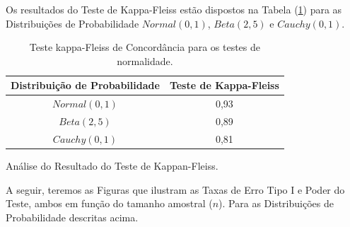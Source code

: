 \documentclass[a4paper,11pt]{article} %
\begin{document}
\vspace{0.5cm}

Os resultados do Teste de Kappa-Fleiss estão dispostos na Tabela (\ref{tab:resultKappaFleiss}) para as Distribuições de Probabilidade $Normal(0, 1)$, $Beta(2, 5)$ e $Cauchy(0, 1)$.

\begin{table}[H]
\centering
\caption{Teste kappa-Fleiss de Concordância para os testes de normalidade.}
    \begin{tabular}{c|c}
    \hline
    Distribuição de Probabilidade  &  Teste de Kappa-Fleiss\\
    \hline
          $Normal(0, 1)$           &  0,93  \\
          $Beta(2, 5)$             &  0,89  \\
          $Cauchy(0, 1)$           &  0,81  \\
    \hline\hline
    \end{tabular}
    
    \label{tab:resultKappaFleiss}
\end{table}

Análise do Resultado do Teste de Kappan-Fleiss.

\vspace{0.5cm}

A seguir, teremos as Figuras que ilustram as Taxas de Erro Tipo I e Poder do Teste, ambos em função do tamanho amostral ($n$). Para as Distribuições de Probabilidade descritas acima.
\end{document}

